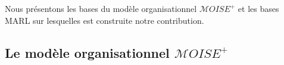 \documentclass[contribution]{jfsma}
\begin{document}




Nous présentons les bases du modèle organisationnel $\mathcal{M}OISE^+$ et les bases MARL sur lesquelles est construite notre contribution.

\subsection{Le modèle organisationnel $\mathcal{M}OISE^+$}


\end{document}
